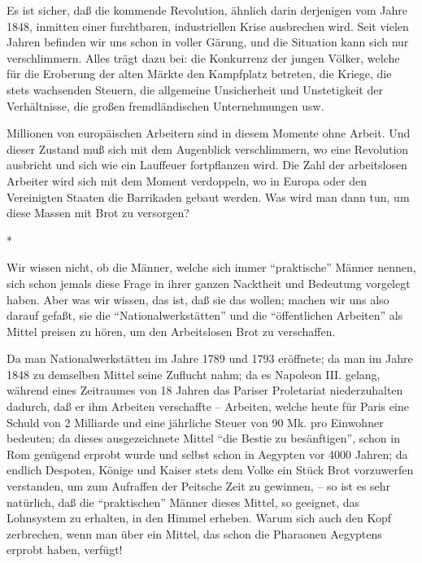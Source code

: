 \documentclass{scrbook}
\begin{document}
Es ist sicher, daß die kommende Revolution, ähnlich darin derjenigen vom Jahre 1848, inmitten einer furchtbaren, industriellen Krise ausbrechen wird. Seit vielen Jahren befinden wir uns schon in voller Gärung, und die Situation kann sich nur verschlimmern. Alles trägt dazu bei: die Konkurrenz der jungen Völker, welche für die Eroberung der alten Märkte den Kampfplatz betreten, die Kriege, die stets wachsenden Steuern, die allgemeine Unsicherheit und Unstetigkeit der Verhältnisse, die großen fremdländischen Unternehmungen usw.

Millionen von europäischen Arbeitern sind in diesem Momente ohne Arbeit. Und dieser Zustand muß sich mit dem Augenblick verschlimmern, wo eine Revolution ausbricht und sich wie ein Lauffeuer fortpflanzen wird. Die Zahl der arbeitslosen Arbeiter wird sich mit dem Moment verdoppeln, wo in Europa oder den Vereinigten Staaten die Barrikaden gebaut werden. Was wird man dann tun, um diese Massen mit Brot zu versorgen?

\begin{center}*\end{center}

Wir wissen nicht, ob die Männer, welche sich immer ``praktische'' Männer nennen, sich schon jemals diese Frage in ihrer ganzen Nacktheit und Bedeutung vorgelegt haben. Aber was wir wissen, das ist, daß sie das  wollen; machen wir uns also darauf gefaßt, sie die ``Nationalwerkstätten'' und die ``öffentlichen Arbeiten'' als Mittel preisen zu hören, um den Arbeitslosen Brot zu verschaffen.

Da man Nationalwerkstätten im Jahre 1789 und 1793 eröffnete; da man im Jahre 1848 zu demselben Mittel seine Zuflucht nahm; da es Napoleon III. gelang, während eines Zeitraumes von 18 Jahren das Pariser Proletariat niederzuhalten dadurch, daß er ihm Arbeiten verschaffte – Arbeiten, welche heute für Paris eine Schuld von 2 Milliarde und eine jährliche Steuer von 90 Mk. pro Einwohner bedeuten; da dieses ausgezeichnete Mittel ``die Bestie zu besänftigen'', schon in Rom genügend erprobt wurde und selbst schon in Aegypten vor 4000 Jahren; da endlich Despoten, Könige und Kaiser stets dem Volke ein Stück Brot vorzuwerfen verstanden, um zum Aufraffen der Peitsche Zeit zu gewinnen, – so ist es sehr natürlich, daß die ``praktischen'' Männer dieses Mittel, so geeignet, das Lohnsystem zu erhalten, in den Himmel erheben. Warum sich auch den Kopf zerbrechen, wenn man über ein Mittel, das schon die Pharaonen Aegyptens erprobt haben, verfügt!
\end{document}
